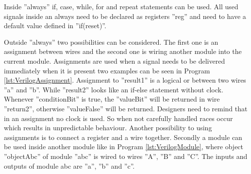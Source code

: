 \documentclass[12pt,a4paper,english,twoside,openright]{tutthesis}
\begin{document}
Inside ''always'' if, case, while, for and repeat statements can be used. All used signals inside an always need to be declared as registers ''reg'' and need to have a default value defined in ''if(reset)''.

Outside ''always'' two possibilities can be considered. The first one is an assignment between wires and the second one is wiring another module into the current module. Assignments are used when a signal needs to be delivered immediately when it is present two examples can be seen in Program \ref{lst:VerilogAssignment}. Assignment to ''result1'' is a logical or between two wires ''a'' and ''b''. While ''result2'' looks like an if-else statement without clock. Whenever ''conditionBit'' is true, the ''valueBit'' will be returned in wire ''return2'', otherwise ''valueFalse'' will be returned. Designers need to remind that in an assignment no clock is used. So when not carefully handled races occur which results in unpredictable behaviour. Another possibility to using assignments is to connect a register and a wire together. Secondly a module can be used inside another module like in Program \ref{lst:VerilogModule}, where object ''objectAbc'' of module ''abc'' is wired to wires ''A'', ''B'' and ''C''. The inputs and outputs of module abc are ''a'', ''b'' and ''c''.
\end{document}
